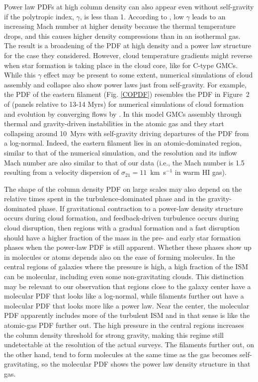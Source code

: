 \documentclass{aa}
\begin{document}
Power law PDFs at high column density can also appear even without self-gravity if
the polytropic index, $\gamma$, is less than 1. According to \cite{pvs98}, low
$\gamma$ leads to an increasing Mach number at higher density because the thermal
temperature drops, and this causes higher density compressions than in an
isothermal gas. The result is a broadening of the PDF at high density and a power
law structure for the case they considered.  However, cloud temperature gradients
might reverse when star formation is taking place in the cloud core, like for C-type GMCs.  
 While this $\gamma$ effect may be
present to some extent, numerical simulations of cloud assembly and collapse also
show power laws just from self-gravity.
For example, the PDF of the eastern filament (Fig. \ref{COPDF}) resembles the PDF
in Figure~2 of \citet{2011MNRAS.416.1436B} (panels relative to 13-14 Myrs) 
for numerical simulations of  cloud formation and evolution  
by converging flows by \citet{2008ApJ...689..290H}. In this model GMCs assembly 
through thermal and gravity-driven instabilities in the atomic gas and they start collapsing
around 10~Myrs with self-gravity driving departures of the PDF from a log-normal.
Indeed, the eastern filament lies in an
atomic-dominated region, similar to that of the numerical simulation, and the
resolution and its inflow Mach number are also similar to that of our data (i.e., the Mach
number is 1.5 resulting from a velocity dispersion of $\sigma_{21}=11$~km~s$^{-1}$
in warm HI gas).

The shape of the column density PDF on large scales may also depend on the
relative times spent in the turbulence-dominated phase and in the gravity-dominated
phase.  If gravitational contraction to a power-law density structure occurs
during cloud formation, and feedback-driven turbulence occurs during cloud
disruption, then regions with a gradual formation and a fast disruption should
have a higher fraction of the mass in the pre- and early star formation phases
when the power-law PDF is still apparent.  Whether these phases show up in
molecules or atoms depends also on the ease of forming molecules. In the central
regions of galaxies where the pressure is high, a high fraction of the ISM can be
molecular, including even some non-gravitating clouds. This distinction may be
relevant to our observation that regions close to the galaxy center have a
molecular PDF that looks like a log-normal, while filaments further out have a
molecular PDF that looks more like a power law. Near the center, the molecular PDF
apparently includes more of the turbulent ISM and in that sense is like the
atomic-gas PDF further out. The high pressure   in the central regions  increases
the column density threshold for strong gravity, making this regime still undetectable 
at the resolution of the actual surveys. The filaments further out, on the other hand, tend to form
molecules at the same time as the gas becomes self-gravitating, so the molecular
PDF shows the power law density structure in that gas. 
\end{document}
